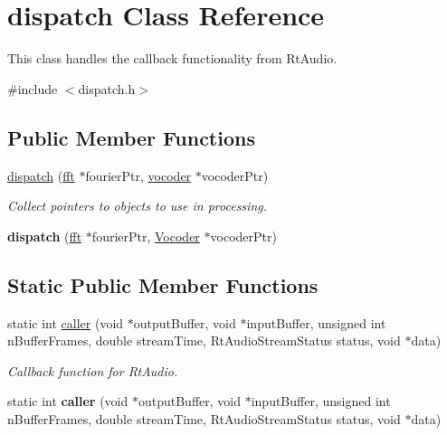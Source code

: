 \hypertarget{classdispatch}{\section{dispatch Class Reference}
\label{classdispatch}
}


This class handles the callback functionality from Rt\-Audio.  




{\ttfamily \#include $<$dispatch.\-h$>$}

\subsection*{Public Member Functions}
\begin{DoxyCompactItemize}
\item 
\hypertarget{classdispatch_a641ec1136a8fdecb8b9ab51fa672a848}{\hyperlink{classdispatch_a641ec1136a8fdecb8b9ab51fa672a848}{dispatch} (\hyperlink{classfft}{fft} $\ast$fourier\-Ptr, \hyperlink{classvocoder}{vocoder} $\ast$vocoder\-Ptr)}\label{classdispatch_a641ec1136a8fdecb8b9ab51fa672a848}

\begin{DoxyCompactList}\small\item\em Collect pointers to objects to use in processing. \end{DoxyCompactList}\item 
\hypertarget{classdispatch_a86ed8ac03c8498d7f75619af8eaff3a2}{{\bfseries dispatch} (\hyperlink{classfft}{fft} $\ast$fourier\-Ptr, \hyperlink{classVocoder}{Vocoder} $\ast$vocoder\-Ptr)}\label{classdispatch_a86ed8ac03c8498d7f75619af8eaff3a2}

\end{DoxyCompactItemize}
\subsection*{Static Public Member Functions}
\begin{DoxyCompactItemize}
\item 
\hypertarget{classdispatch_a78e0b45ddb573d1b843ce02cd9092557}{static int \hyperlink{classdispatch_a78e0b45ddb573d1b843ce02cd9092557}{caller} (void $\ast$output\-Buffer, void $\ast$input\-Buffer, unsigned int n\-Buffer\-Frames, double stream\-Time, Rt\-Audio\-Stream\-Status status, void $\ast$data)}\label{classdispatch_a78e0b45ddb573d1b843ce02cd9092557}

\begin{DoxyCompactList}\small\item\em Callback function for Rt\-Audio. \end{DoxyCompactList}\item 
\hypertarget{classdispatch_a2bc93711c1aee895c430aece41ec026a}{static int {\bfseries caller} (void $\ast$output\-Buffer, void $\ast$input\-Buffer, unsigned int n\-Buffer\-Frames, double stream\-Time, Rt\-Audio\-Stream\-Status status, void $\ast$data)}\label{classdispatch_a2bc93711c1aee895c430aece41ec026a}

\end{DoxyCompactItemize}
